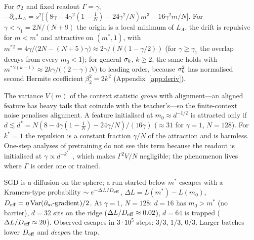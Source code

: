 \begin{proposition}
\label{prop:repulsion}
For $\sigma_2$ and fixed readout $\Gamma=\gamma$, $-\partial_mL_A=s^2\big[(8\gamma-4\gamma^2(1-\tfrac1N)-24\gamma^2/N)m^3-16\gamma^2m/N\big]$. For
$\gamma<\gamma_1=2N/(N+9)$ the origin is a local minimum of $L_A$, the drift is repulsive for $m<m^*$ and attractive on $(m^*,1)$, with
$m^{*2}=4\gamma/\big(2N-(N+5)\gamma\big)\approx2\gamma/(N(1-\gamma/2))$ (for $\gamma\ge\gamma_1$ the overlap decays from every $m_0<1$);
for general $\sigma_k$, $k\ge2$, the same holds with $m^{*\,2(k-1)}\approx2k\gamma/\big((2-\gamma)N\big)$ to leading order, because $\sigma_k^2$ has
normalised second Hermite coefficient $\beta_2^2=2k^2$ (Appendix~\ref{app:deriv}).
\end{proposition}
The variance $V(m)$ of the context statistic \emph{grows} with alignment---an aligned feature has heavy tails that coincide
with the teacher's---so the finite-context noise penalises alignment. A feature initialised at $m_0\approx d^{-1/2}$ is attracted
only if $d\lesssim d^*=N(8-4\gamma(1-\tfrac1N)-24\gamma/N)/(16\gamma)$ ($\approx31$ for $\gamma=1$, $N=128$). For $k^*=1$ the repulsion is a constant
fraction $\gamma/N$ of the attraction and is harmless. One-step analyses of pretraining do not see this term because the readout
is initialised at $\gamma\propto d^{-k^*}$~\citep[Lemma~18]{oko2024pretrained}, which makes $\Gamma^2V/N$ negligible; the phenomenon lives where
$\Gamma$ is order one or trained.

\begin{remark}
SGD is a diffusion on the sphere; a run started below $m^*$ escapes with a Kramers-type probability $\sim e^{-\Delta L/D_{\rm eff}}$,
$\Delta L=L(m^*)-L(m_0)$, $D_{\rm eff}=\eta\,\mathrm{Var}(\partial_m\text{-gradient})/2$. At $\gamma=1$, $N=128$: $d=16$ has $m_0>m^*$ (no barrier),
$d=32$ sits on the ridge ($\Delta L/D_{\rm eff}\approx0.02$), $d=64$ is trapped ($\Delta L/D_{\rm eff}\approx20$). Observed escapes in $3\cdot10^5$ steps: $3/3$, $1/3$, $0/3$.
Larger batches lower $D_{\rm eff}$ and \emph{deepen} the trap.
\end{remark}

